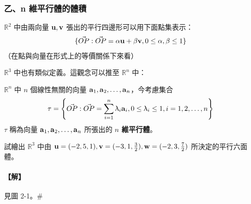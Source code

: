 \subsubsection*{乙、n 維平行體的體積}\label{subsec:b6-1-2-b}

$\mathbb{R}^2$ 中由兩向量 $\boldsymbol{\mathbf{u}}, \boldsymbol{\mathbf{v}}$ 張出的平行四邊形可以用下面點集表示：
\begin{equation}
\{ \vec{OP} : \vec{OP} = \alpha\boldsymbol{\mathbf{u}} + \beta\boldsymbol{\mathbf{v}}, 0 \le \alpha, \beta \le 1 \} \label{eq:b6-1-2-1}
\end{equation}
（在點與向量在形式上的等價關係下來看）

$\mathbb{R}^3$ 中也有類似定義。這觀念可以推至 $\mathbb{R}^n$ 中：

\begin{definition}\label{def:b6-1-4}
$\mathbb{R}^n$ 中 $n$ 個線性無關的向量 $\boldsymbol{\mathbf{a}}_1, \boldsymbol{\mathbf{a}}_2, \dots, \boldsymbol{\mathbf{a}}_n$，今考慮集合
\begin{equation}
\tau = \left\{ \vec{OP} : \vec{OP} = \sum_{i=1}^n \uplambda_i \boldsymbol{\mathbf{a}}_i, 0 \le \uplambda_i \le 1, i=1, 2, \dots, n \right\} \label{eq:b6-1-2-2}
\end{equation}
$\tau$ 稱為向量 $\boldsymbol{\mathbf{a}}_1, \boldsymbol{\mathbf{a}}_2, \dots, \boldsymbol{\mathbf{a}}_n$ 所張出的 \textbf{$n$ 維平行體}。
\end{definition}

\begin{example}\label{ex:b6-1-11}
試繪出 $\mathbb{R}^3$ 中由 $\boldsymbol{\mathbf{u}}=(-2, 5, 1), \boldsymbol{\mathbf{v}}=(-3, 1, \frac{3}{2}), \boldsymbol{\mathbf{w}}=(-2, 3, \frac{7}{2})$ 所決定的平行六面體。
\end{example}

\paragraph{【解】}
見圖 2-1。\hfill$\#$

